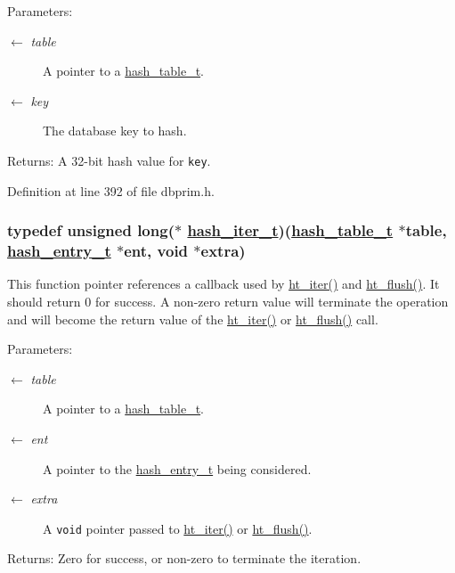 \begin{Desc}
\item[Parameters:]
\begin{description}
\item[\mbox{$\leftarrow$} {\em table}]A pointer to a \hyperlink{group__dbprim__hash_ga1}{hash\_\-table\_\-t}. \item[\mbox{$\leftarrow$} {\em key}]The database key to hash.\end{description}
\end{Desc}
\begin{Desc}
\item[Returns:]A 32-bit hash value for {\tt key}.\end{Desc}


Definition at line 392 of file dbprim.h.\hypertarget{group__dbprim__hash_ga3}{
\subsubsection[hash\_\-iter\_\-t]{\setlength{\rightskip}{0pt plus 5cm}typedef unsigned long($\ast$ \hyperlink{group__dbprim__hash_ga3}{hash\_\-iter\_\-t})(\hyperlink{struct__hash__table__s}{hash\_\-table\_\-t} $\ast$table, \hyperlink{struct__hash__entry__s}{hash\_\-entry\_\-t} $\ast$ent, void $\ast$extra)}}
\label{group__dbprim__hash_ga3}


This function pointer references a callback used by \hyperlink{group__dbprim__hash_ga15}{ht\_\-iter()} and \hyperlink{group__dbprim__hash_ga16}{ht\_\-flush()}. It should return 0 for success. A non-zero return value will terminate the operation and will become the return value of the \hyperlink{group__dbprim__hash_ga15}{ht\_\-iter()} or \hyperlink{group__dbprim__hash_ga16}{ht\_\-flush()} call.

\begin{Desc}
\item[Parameters:]
\begin{description}
\item[\mbox{$\leftarrow$} {\em table}]A pointer to a \hyperlink{group__dbprim__hash_ga1}{hash\_\-table\_\-t}. \item[\mbox{$\leftarrow$} {\em ent}]A pointer to the \hyperlink{group__dbprim__hash_ga2}{hash\_\-entry\_\-t} being considered. \item[\mbox{$\leftarrow$} {\em extra}]A {\tt void} pointer passed to \hyperlink{group__dbprim__hash_ga15}{ht\_\-iter()} or \hyperlink{group__dbprim__hash_ga16}{ht\_\-flush()}.\end{description}
\end{Desc}
\begin{Desc}
\item[Returns:]Zero for success, or non-zero to terminate the iteration.\end{Desc}



